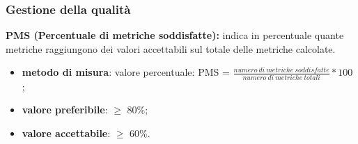 \subsubsection{Gestione della qualità}
\textbf{PMS (Percentuale di metriche soddisfatte):} indica in percentuale quante metriche raggiungono dei valori accettabili sul totale delle metriche calcolate.
\begin{itemize}
    \item \textbf{metodo di misura}: valore percentuale: PMS = $\frac{numero \ di \ metriche \ soddisfatte}{numero \ di \ metriche \ totali} * 100$ ;
    \item \textbf{valore preferibile}: $\geq$ 80\%;
    \item \textbf{valore accettabile}: $\geq$ 60\%.
\end{itemize}
\newpage
